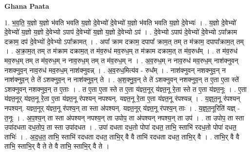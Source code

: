 \documentclass[17pt]{extarticle}
\begin{document}
\textbf{Ghana Paata } \newline

1. भ॒व॒ति॒ य॒ज्ञो य॒ज्ञो भ॑वति भवति य॒ज्ञो दे॒वेभ्यो॑ दे॒वेभ्यो॑ य॒ज्ञो भ॑वति भवति य॒ज्ञो दे॒वेभ्यः॑ । . य॒ज्ञो दे॒वेभ्यो॑ दे॒वेभ्यो॑ य॒ज्ञो य॒ज्ञो दे॒वेभ्यो ऽपाप॑ दे॒वेभ्यो॑ य॒ज्ञो य॒ज्ञो दे॒वेभ्यो ऽप॑ । . दे॒वेभ्यो ऽपाप॑ दे॒वेभ्यो॑ दे॒वेभ्यो ऽपा᳚क्राम दक्राम॒ दप॑ दे॒वेभ्यो॑ दे॒वेभ्यो ऽपा᳚क्रामत् । . अपा᳚ क्राम दक्राम॒ दपापा᳚ क्राम॒त् तम् त म॑क्राम॒ दपापा᳚क्राम॒त् तम् । . अ॒क्रा॒म॒त् तम् त म॑क्राम दक्राम॒त् त म॑व॒रुध॑ मव॒रुध॒म् त म॑क्राम दक्राम॒त् त म॑व॒रुध᳚म् । . त म॑व॒रुध॑ मव॒रुध॒म् तम् त म॑व॒रुध॒म् न नाव॒रुध॒म् तम् त म॑व॒रुध॒म् न । . अ॒व॒रुध॒म् न नाव॒रुध॑ मव॒रुध॒म् नाश॑क्नुवन् नशक्नुव॒न् नाव॒रुध॑ मव॒रुध॒म् नाश॑क्नुवन्न् । . अ॒व॒रुध॒मित्य॑व - रुध᳚म् । . नाश॑क्नुवन् नशक्नुव॒न् न नाश॑क्नुव॒न् ते ते॑ ऽशक्नुव॒न् न नाश॑क्नुव॒न् ते । . अ॒श॒क्नु॒व॒न् ते ते॑ ऽशक्नुवन् नशक्नुव॒न् त ए॒ता ए॒ता स्ते॑ ऽशक्नुवन् नशक्नुव॒न् त ए॒ताः । . त ए॒ता ए॒ता स्ते त ए॒ता य॑ज्ञ्त॒नूर् य॑ज्ञ्त॒नू रे॒ता स्ते त ए॒ता य॑ज्ञ्त॒नूः । . ए॒ता य॑ज्ञ्त॒नूर् य॑ज्ञ्त॒नू रे॒ता ए॒ता य॑ज्ञ्त॒नू र॑पश्यन् नपश्यन्. यज्ञ्त॒नू रे॒ता ए॒ता य॑ज्ञ्त॒नू र॑पश्यन्न् । . य॒ज्ञ्॒त॒नू र॑पश्यन् नपश्यन्. यज्ञ्त॒नूर् य॑ज्ञ्त॒नू र॑पश्य॒न् ता स्ता अ॑पश्यन्. यज्ञ्त॒नूर् य॑ज्ञ्त॒नू र॑पश्य॒न् ताः । . य॒ज्ञ्॒त॒नूरिति॑ यज्ञ् - त॒नूः । . अ॒प॒श्य॒न् ता स्ता अ॑पश्यन् नपश्य॒न् ता उपोप॒ ता अ॑पश्यन् नपश्य॒न् ता उप॑ । . ता उपोप॒ ता स्ता उपा॑दधता दध॒तोप॒ ता स्ता उपा॑दधत । . उपा॑ दधता दध॒तो पोपा॑ दधत॒ ताभि॒ स्ताभि॑ रदध॒तो पोपा॑ दधत॒ ताभिः॑ । . अ॒द॒ध॒त॒ ताभि॒ स्ताभि॑ रदधता दधत॒ ताभि॒र् वै वै ताभि॑ रदधता दधत॒ ताभि॒र् वै । . ताभि॒र् वै वै ताभि॒ स्ताभि॒र् वै ते ते वै ताभि॒ स्ताभि॒र् वै ते । \newline
\end{document}
